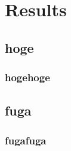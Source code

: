 \chapter{Results}\label{ch:results}
\section{hoge}
\subsection{hogehoge}
\section{fuga}
\subsection{fugafuga}